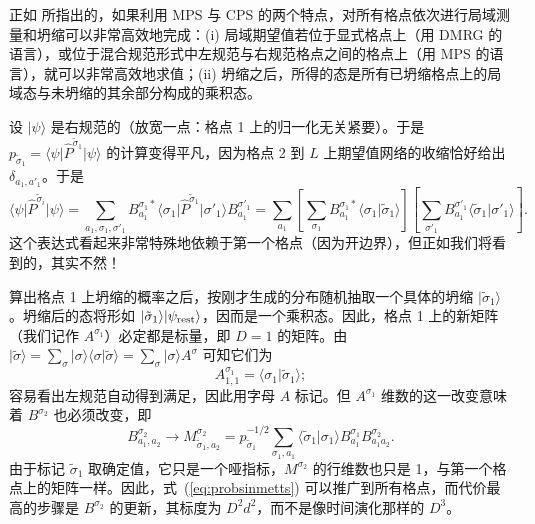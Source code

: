 \documentclass[a4paper,10pt,oneside,onecolumn,1p,times]{elsarticle}
\newcommand{\bra}[1]{\mbox{$\langle #1  |$}}
\newcommand{\ket}[1]{\mbox{$| #1  \rangle$}}
\newcommand{\braket}[2]{\mbox{$\langle #1  | #2 \rangle$}} 	%
\begin{document}
正如 \cite{Stoudenmire10} 所指出的，如果利用 MPS 与 CPS 的两个特点，对所有格点依次进行局域测量和坍缩可以非常高效地完成：(i) 局域期望值若位于显式格点上（用 DMRG 的语言），或位于混合规范形式中左规范与右规范格点之间的格点上（用 MPS 的语言），就可以非常高效地求值；(ii) 坍缩之后，所得的态是所有已坍缩格点上的局域态与未坍缩的其余部分构成的乘积态。

设 $\ket{\psi}$ 是右规范的（放宽一点：格点 1 上的归一化无关紧要）。于是 $p_{\tilde{\sigma}_1} =\bra{\psi} \hat{P}^{\tilde{\sigma}_1} \ket{\psi}$ 的计算变得平凡，因为格点 2 到 $L$ 上期望值网络的收缩恰好给出 $\delta_{a_1,a'_1}$。于是
\begin{equation}
\bra{\psi} \hat{P}^{\tilde{\sigma}_i} \ket{\psi} = \sum_{a_1,\sigma_1,\sigma'_1} B^{\sigma_1 *}_{a_1} \bra{\sigma_1} \hat{P}^{\tilde{\sigma}_1} \ket{\sigma'_1} B^{\sigma'_1}_{a_1} = 
\sum_{a_1} \left[ \sum_{\sigma_1} B^{\sigma_1*}_{a_1} \braket{\sigma_1}{\tilde{\sigma}_1} \right]
\left[ \sum_{\sigma'_1} B^{\sigma'_1}_{a_1} \braket{\tilde{\sigma}_1}{\sigma'_1} \right] .
\label{eq:probsinmetts}
\end{equation}
这个表达式看起来非常特殊地依赖于第一个格点（因为开边界），但正如我们将看到的，其实不然！

算出格点 1 上坍缩的概率之后，按刚才生成的分布随机抽取一个具体的坍缩 $\ket{\tilde{\sigma}_1}$。坍缩后的态将形如 $\ket{\tilde{\sigma}_1} \ket{\psi_{{\rm rest}}}$，因而是一个乘积态。因此，格点 1 上的新矩阵（我们记作 $A^{\sigma_1}$）必定都是标量，即 $D=1$ 的矩阵。由
$\ket{\tilde{\sigma}} = \sum_{\sigma} \ket{\sigma} \braket{\sigma}{\tilde{\sigma}} = \sum_\sigma \ket{\sigma} A^{\sigma}$ 可知它们为
\begin{equation}
A^{\sigma_1}_{1,1} = \braket{\sigma_1}{\tilde{\sigma}_1} ;
\end{equation}
容易看出左规范自动得到满足，因此用字母 $A$ 标记。但 $A^{\sigma_1}$ 维数的这一改变意味着 $B^{\sigma_2}$ 也必须改变，即
\begin{equation}
B^{\sigma_2}_{a_1,a_2} \rightarrow M^{\sigma_2}_{\tilde{\sigma}_1,a_2} =
p_{\tilde{\sigma}_1}^{-1/2} \sum_{\sigma_1,a_1} \braket{\tilde{\sigma}_1}{\sigma_1} B^{\sigma_1}_{a_1} B^{\sigma_2}_{a_1 a_2} .
\end{equation}
由于标记 $\tilde{\sigma}_1$ 取确定值，它只是一个哑指标，$M^{\sigma_2}$ 的行维数也只是 1，与第一个格点上的矩阵一样。因此，式~(\ref{eq:probsinmetts}) 可以推广到所有格点，而代价最高的步骤是 $B^{\sigma_2}$ 的更新，其标度为 $D^2 d^2$，而不是像时间演化那样的 $D^3$。
\end{document}
